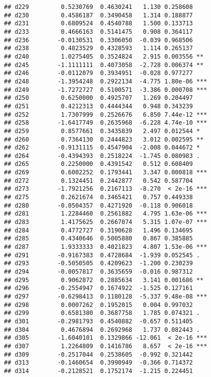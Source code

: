 \documentclass[
]{article}
\begin{document}
\begin{verbatim}
## d229         0.5230769  0.4630241   1.130 0.258608    
## d230         0.4586187  0.3490458   1.314 0.188877    
## d231         0.6809524  0.4540788   1.500 0.133713    
## d233         0.4666163  0.5141475   0.908 0.364117    
## d236        -0.0130531  0.3306050  -0.039 0.968506    
## d238         0.4823529  0.4328593   1.114 0.265137    
## d240         1.0275405  0.3524824   2.915 0.003556 ** 
## d245        -1.1111111  0.4073058  -2.728 0.006374 ** 
## d246        -0.0112079  0.3934951  -0.028 0.977277    
## d248        -1.3954248  0.2922134  -4.775 1.80e-06 ***
## d249        -1.7272727  0.5100571  -3.386 0.000708 ***
## d250         0.6250000  0.4925707   1.269 0.204497    
## d251         0.4212313  0.4444344   0.948 0.343239    
## d252         1.7307999  0.2526676   6.850 7.44e-12 ***
## d258        -1.6417749  0.2635968  -6.228 4.74e-10 ***
## d259         0.8577661  0.3435839   2.497 0.012544 *  
## d260         0.7364130  0.2444823   3.012 0.002595 ** 
## d262        -0.9131115  0.4547904  -2.008 0.044672 *  
## d264        -0.4394393  0.2518224  -1.745 0.080983 .  
## d265         0.2250000  0.4391542   0.512 0.608409    
## d269         0.6002252  0.1793441   3.347 0.000818 ***
## d272         0.1324451  0.2442877   0.542 0.587704    
## d273        -1.7921256  0.2167113  -8.270  < 2e-16 ***
## d275         0.2621674  0.3465421   0.757 0.449338    
## d280        -0.0504357  0.4271920  -0.118 0.906018    
## d281         1.2284460  0.2561882   4.795 1.63e-06 ***
## d283         1.4175625  0.2667074   5.315 1.07e-07 ***
## d284         0.4772727  0.3190628   1.496 0.134695    
## d285         0.4340646  0.5005880   0.867 0.385885    
## d287         1.9333333  0.4021823   4.807 1.53e-06 ***
## d291        -0.9167383  0.4728684  -1.939 0.052545 .  
## d293        -0.5050505  0.4209623  -1.200 0.230239    
## d294        -0.0057817  0.3635659  -0.016 0.987312    
## d295         0.9062872  0.2885634   3.141 0.001686 ** 
## d296        -0.2554947  0.1674922  -1.525 0.127161    
## d297        -0.6298413  0.1180128  -5.337 9.48e-08 ***
## d298         0.0007262  0.1952015   0.004 0.997032    
## d299         0.6581380  0.3687758   1.785 0.074321 .  
## d301        -0.2981793  0.4540882  -0.657 0.511405    
## d304         0.4676894  0.2692968   1.737 0.082443 .  
## d305        -1.6040101  0.1329866 -12.061  < 2e-16 ***
## d307         1.2264809  0.1416786   8.657  < 2e-16 ***
## d309        -0.2517044  0.2538605  -0.992 0.321442    
## d313        -0.1460654  0.3990949  -0.366 0.714372    
## d314        -0.2128521  0.1752174  -1.215 0.224451    

\end{verbatim}
\end{document}
